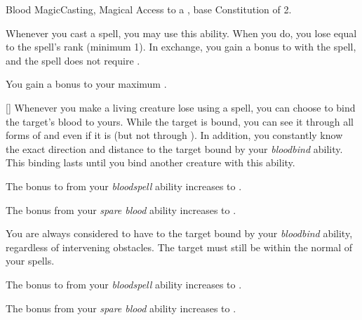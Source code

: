     \begin{feat}{Blood Magic}{Casting, Magical}
        \featpre Access to a , base Constitution of 2.

         Whenever you cast a spell, you may use this ability.
        When you do, you lose  equal to the spell's rank (minimum 1).
        In exchange, you gain a  bonus to  with the spell, and the spell does not require .

         You gain a  bonus to your maximum .

        [] Whenever you make a living creature lose  using a spell, you can choose to bind the target's blood to yours.
        While the target is bound, you can see it through all forms of  and even if it is  (but not through ).
        In addition, you constantly know the exact direction and distance to the target bound by your \textit{bloodbind} ability.
        This binding lasts until you bind another creature with this ability.

         The bonus to  from your \textit{bloodspell} ability increases to .

         The bonus from your \textit{spare blood} ability increases to .

         You are always considered to have  to the target bound by your \textit{bloodbind} ability, regardless of intervening obstacles.
        The target must still be within the normal  of your spells.

         The bonus to  from your \textit{bloodspell} ability increases to .

         The bonus from your \textit{spare blood} ability increases to .
    \end{feat}

